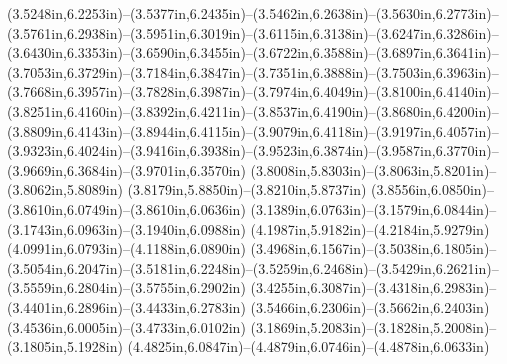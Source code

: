 (3.5248in,6.2253in)--(3.5377in,6.2435in)--(3.5462in,6.2638in)--(3.5630in,6.2773in)--(3.5761in,6.2938in)--(3.5951in,6.3019in)--(3.6115in,6.3138in)--(3.6247in,6.3286in)--(3.6430in,6.3353in)--(3.6590in,6.3455in)--(3.6722in,6.3588in)--(3.6897in,6.3641in)--(3.7053in,6.3729in)--(3.7184in,6.3847in)--(3.7351in,6.3888in)--(3.7503in,6.3963in)--(3.7668in,6.3957in)--(3.7828in,6.3987in)--(3.7974in,6.4049in)--(3.8100in,6.4140in)--(3.8251in,6.4160in)--(3.8392in,6.4211in)--(3.8537in,6.4190in)--(3.8680in,6.4200in)--(3.8809in,6.4143in)--(3.8944in,6.4115in)--(3.9079in,6.4118in)--(3.9197in,6.4057in)--(3.9323in,6.4024in)--(3.9416in,6.3938in)--(3.9523in,6.3874in)--(3.9587in,6.3770in)--(3.9669in,6.3684in)--(3.9701in,6.3570in) (3.8008in,5.8303in)--(3.8063in,5.8201in)--(3.8062in,5.8089in) (3.8179in,5.8850in)--(3.8210in,5.8737in) (3.8556in,6.0850in)--(3.8610in,6.0749in)--(3.8610in,6.0636in) (3.1389in,6.0763in)--(3.1579in,6.0844in)--(3.1743in,6.0963in)--(3.1940in,6.0988in) (4.1987in,5.9182in)--(4.2184in,5.9279in) (4.0991in,6.0793in)--(4.1188in,6.0890in) (3.4968in,6.1567in)--(3.5038in,6.1805in)--(3.5054in,6.2047in)--(3.5181in,6.2248in)--(3.5259in,6.2468in)--(3.5429in,6.2621in)--(3.5559in,6.2804in)--(3.5755in,6.2902in) (3.4255in,6.3087in)--(3.4318in,6.2983in)--(3.4401in,6.2896in)--(3.4433in,6.2783in) (3.5466in,6.2306in)--(3.5662in,6.2403in) (3.4536in,6.0005in)--(3.4733in,6.0102in) (3.1869in,5.2083in)--(3.1828in,5.2008in)--(3.1805in,5.1928in) (4.4825in,6.0847in)--(4.4879in,6.0746in)--(4.4878in,6.0633in)
